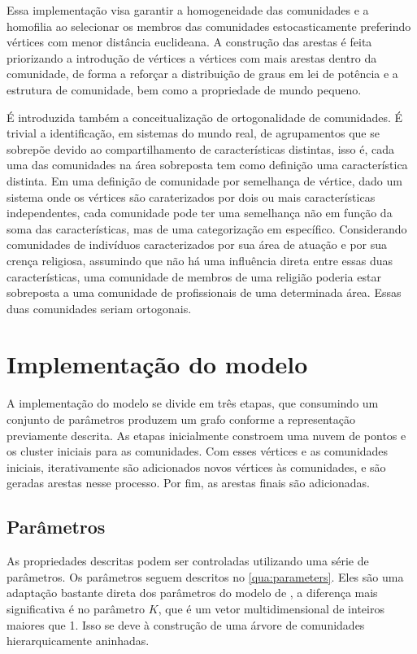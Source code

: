 \documentclass[notes.tex]{subfiles}
\begin{document}
Essa implementação visa garantir a homogeneidade das comunidades e a homofilia ao selecionar os membros das comunidades estocasticamente preferindo vértices com menor distância euclideana.
A construção das arestas é feita priorizando a introdução de vértices a vértices com mais arestas dentro da comunidade, de forma a reforçar a distribuição de graus em lei de potência e a estrutura de comunidade, bem como a propriedade de mundo pequeno.

É introduzida também a conceitualização de ortogonalidade de comunidades.
É trivial a identificação, em sistemas do mundo real, de agrupamentos que se sobrepõe devido ao compartilhamento de características distintas, isso é, cada uma das comunidades na área sobreposta tem como definição uma característica distinta.
Em uma definição de comunidade por semelhança de vértice, dado um sistema onde os vértices são caraterizados por dois ou mais características independentes, cada comunidade pode ter uma semelhança não em função da soma das características, mas de uma categorização em específico.
Considerando comunidades de indivíduos caracterizados por sua área de atuação e por sua crença religiosa, assumindo que não há uma influência direta entre essas duas características, uma comunidade de membros de uma religião poderia estar sobreposta a uma comunidade de profissionais de uma determinada área.
Essas duas comunidades seriam ortogonais.

\section{Implementação do modelo}

A implementação do modelo se divide em três etapas, que consumindo um conjunto de parâmetros produzem um grafo conforme a representação previamente descrita.
As etapas inicialmente constroem uma nuvem de pontos e os cluster iniciais para as comunidades.
Com esses vértices e as comunidades iniciais, iterativamente são adicionados novos vértices às comunidades, e são geradas arestas nesse processo.
Por fim, as arestas finais são adicionadas.

\subsection{Parâmetros}

As propriedades descritas podem ser controladas utilizando uma série de parâmetros.
Os parâmetros seguem descritos no \autoref{qua:parameters}.
Eles são uma adaptação bastante direta dos parâmetros do modelo de , a diferença mais significativa é no parâmetro $K$, que é um vetor multidimensional de inteiros maiores que 1.
Isso se deve à construção de uma árvore de comunidades hierarquicamente aninhadas.
\end{document}
